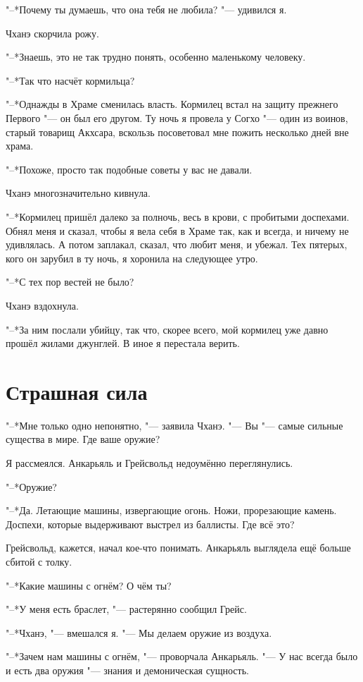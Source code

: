 \documentclass[a4paper,10pt,fleqn]{book}
\begin{document}
"--*Почему ты думаешь, что она тебя не любила? "--- удивился я.

Чханэ скорчила рожу.

"--*Знаешь, это не так трудно понять, особенно маленькому человеку.

"--*Так что насчёт кормильца?

"--*Однажды в Храме сменилась власть.
Кормилец встал на защиту прежнего Первого "--- он был его другом.
Ту ночь я провела у Согхо "--- один из воинов, старый товарищ Акхсара, вскользь посоветовал мне пожить несколько дней вне храма.

"--*Похоже, просто так подобные советы у вас не давали.

Чханэ многозначительно кивнула.

"--*Кормилец пришёл далеко за полночь, весь в крови, с пробитыми доспехами.
Обнял меня и сказал, чтобы я вела себя в Храме так, как и всегда, и ничему не удивлялась.
А потом заплакал, сказал, что любит меня, и убежал.
Тех пятерых, кого он зарубил в ту ночь, я хоронила на следующее утро.

"--*С тех пор вестей не было?

Чханэ вздохнула.

"--*За ним послали убийцу, так что, скорее всего, мой кормилец уже давно прошёл жилами джунглей.
В иное я перестала верить.

\section{Страшная сила}

"--*Мне только одно непонятно, "--- заявила Чханэ.
"--- Вы "--- самые сильные существа в мире.
Где ваше оружие?

Я рассмеялся.
Анкарьяль и Грейсвольд недоумённо переглянулись.

"--*Оружие?

"--*Да.
Летающие машины, извергающие огонь.
Ножи, прорезающие камень.
Доспехи, которые выдерживают выстрел из баллисты.
Где всё это?

Грейсвольд, кажется, начал кое-что понимать.
Анкарьяль выглядела ещё больше сбитой с толку.

"--*Какие машины с огнём?
О чём ты?

"--*У меня есть браслет, "--- растерянно сообщил Грейс.

"--*Чханэ, "--- вмешался я.
"--- Мы делаем оружие из воздуха.

"--*Зачем нам машины с огнём, "--- проворчала Анкарьяль.
"--- У нас всегда было и есть два оружия "--- знания и демоническая сущность.
\end{document}
